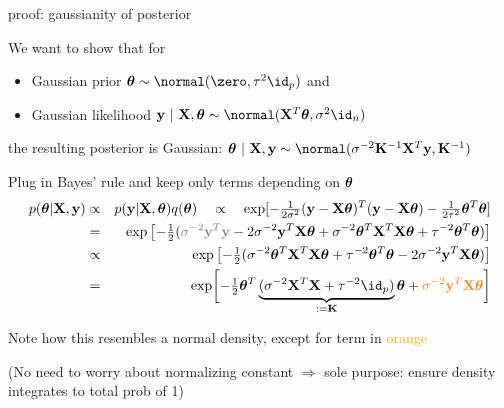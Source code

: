 \documentclass[11pt,compress,t,notes=noshow, xcolor=table]{beamer}
\begin{document}
\begin{framei}[fs=small]{proof: gaussianity of posterior}
\item We want to show that for
\begin{itemize} \small
  \item Gaussian prior $\thetav \sim \normal(\zero, \tau^2 \id_p)$ and 
  \item Gaussian likelihood $\yv ~|~ \Xmat, \thetav \sim \normal(\Xmat^T \thetav, \sigma^2 \id_n)$ 
\end{itemize}
the resulting posterior is Gaussian: $\thetav ~|~ \Xmat, \yv \sim \normal(\sigma^{-2}\Kinv\Xmat^T\yv, \Kinv)$ 
\vfill
\item Plug in Bayes' rule and keep only terms depending on $\bm{\theta}$
\begin{eqnarray*}
p(\thetav | \Xmat, \yv) &\propto& p(\yv | \Xmat, \thetav) q(\thetav) \quad \propto \quad \exp [-\tfrac{1}{2\sigma^2}(\yv - \Xmat\thetav)^T(\yv - \Xmat\thetav)-\tfrac{1}{2\tau^2}\thetav^T\thetav ] \\
&=& \exp \left[ -\tfrac{1}{2} (\textcolor{black!50}{\sigma^{-2}\yv^T\yv} - 2 \sigma^{-2} \yv^T \Xmat \thetav + \sigma^{-2}\thetav^T \Xmat^T \Xmat \thetav  + \tau^{-2} \thetav^T\thetav ) \right] \\
&\propto& \exp \left[ -\tfrac{1}{2} (\sigma^{-2}\thetav^T \Xmat^T \Xmat \thetav  + \tau^{-2} \thetav^T\thetav  - 2 \sigma^{-2} \yv^T \Xmat \thetav ) \right] \\
&=& \exp \biggl[ -\tfrac{1}{2}\thetav^T\underbrace{(\sigma^{-2} \Xmat^T \Xmat + \tau^{-2} \id_p )}_{:= \Kmat} \thetav  +\textcolor{orange}{\sigma^{-2} \yv^T \Xmat \thetav} \biggr] 
\end{eqnarray*}
\item Note how this resembles a normal density, except for term in \textcolor{orange}{orange}
\item (No need to worry about normalizing constant $\Rightarrow$ sole purpose: ensure density integrates to total prob of 1)
\end{framei}
\end{document}
